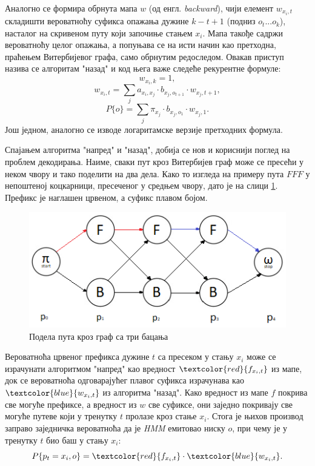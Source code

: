 \documentclass[12pt,oneside]{memoir}
\begin{document}
\begin{CJK}{UTF8}{ipxm}
Аналогно се формира обрнута мапа $w$ (од енгл. \textit{backward}), чији елемент $w_{x_i, t}$ складишти вероватноћу суфикса опажања дужине $k-t+1$ (подниз $o_t...o_k$), насталог на скривеном путу који започиње стањем $x_i$. Мапа такође садржи вероватноћу целог опажања, а попуњава се на исти начин као претходна, праћењем Витербијевог графа, само обрнутим редоследом. Овакав приступ назива се алгоритам "назад" и код њега важе следеће рекурентне формуле: $$w_{x_i, k} = 1,$$ $$w_{x_i, t} = \sum_j  a_{x_i, x_j} \cdot b_{x_j, o_{t+1}} \cdot w_{x_j, t+1},$$ $$P\{o\} = \sum_j \pi_{x_j} \cdot b_{x_j, o_1} \cdot w_{x_j, 1}.$$ Још једном, аналогно се изводе логаритамске верзије претходних формула.

Спајањем алгоритма "напред" и "назад", добија се нов и кориснији поглед на проблем декодирања. Наиме, сваки пут кроз Витербијев граф може се пресећи у неком чвору и тако поделити на два дела. Како то изгледа на примеру пута $FFF$ у непоштеној коцкарници, пресеченог у средњем чвору, дато је на слици \ref{fig:tripod}. Префикс је наглашен црвеном, а суфикс плавом бојом.

\begin{figure}[H]
  \centering
  \includegraphics[width=.9\textwidth]{tri_podela.png}
  \caption{Подела пута кроз граф са три бацања}
  \label{fig:tripod}
\end{figure}

Вероватноћа црвеног префикса дужине $t$ са пресеком у стању $x_i$ може се израчунати алгоритмом "напред" као вредност $\textcolor{red}{f_{x_i, t}}$ из мапе, док се вероватноћа одговарајућег плавог суфикса израчунава као $\textcolor{blue}{w_{x_i, t}}$ из алгоритма "назад". Како вредност из мапе $f$ покрива све могуће префиксе, а вредност из $w$ све суфиксе, они заједно покривају све могуће путеве који у тренутку $t$ пролазе кроз стање $x_i$. Стога је њихов производ заправо заједничка вероватноћа да је \textit{HMM} емитовао ниску $o$, при чему је у тренутку $t$ био баш у стању $x_i$: $$P\{p_t = x_i, o\} = \textcolor{red}{f_{x_i, t}} \cdot \textcolor{blue}{w_{x_i, t}}.$$


\end{CJK}
\end{document}
